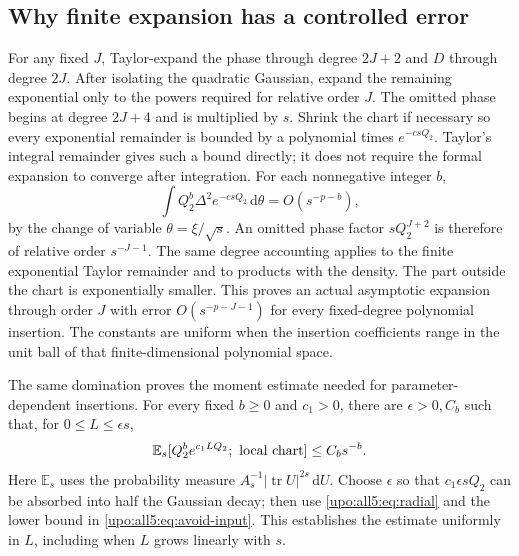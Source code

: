 \documentclass[11pt,letterpaper]{article}
\theoremstyle{remark}\newtheorem{remark}[theorem]{Remark}
\numberwithin{equation}{section}
\newcommand{\E}{\mathbb E}
\newcommand{\tr}{\operatorname{tr}}
\newcommand{\dd}{\,\mathrm d}
\begin{document}
\subsection{Why finite expansion has a controlled error}
For any fixed $J$, Taylor-expand the phase through degree $2J+2$
and $D$ through degree $2J$. After isolating the quadratic Gaussian,
expand the remaining exponential only to the powers required for
relative order $J$. The omitted phase begins at degree $2J+4$ and
is multiplied by $s$. Shrink the chart if necessary so every
exponential remainder is bounded by a polynomial times
$e^{-csQ_2}$. Taylor's integral remainder gives such a bound directly;
it does not require the formal expansion to converge after integration.
For each nonnegative integer $b$,
\begin{equation}\label{upo:all5:eq:radial}
 \int Q_2^b\Delta^2e^{-csQ_2}\dd\theta
                   =O(s^{-p-b}),
\end{equation}
by the change of variable $\theta=\xi/\sqrt{s}$.
An omitted phase factor $sQ_2^{J+2}$ is therefore of relative
order $s^{-J-1}$. The same degree accounting applies to the finite
exponential Taylor remainder and to products with the density.
The part outside the chart is exponentially smaller. This proves
an actual asymptotic expansion through order $J$ with error
$O(s^{-p-J-1})$ for every fixed-degree polynomial insertion.
The constants are uniform when the insertion coefficients range in
the unit ball of that finite-dimensional polynomial space.

The same domination proves the moment estimate needed for
parameter-dependent insertions. For every fixed $b\ge0$ and $c_1>0$,
there are $\epsilon>0,C_b$ such that, for $0\le L\le\epsilon s$,
\begin{equation}\label{upo:all5:eq:tilted-moment}
 \E_s[Q_2^b e^{c_1LQ_2};\ \hbox{local chart}]
                        \le C_b s^{-b}.
\end{equation}
Here $\E_s$ uses the probability measure
$A_s^{-1}|\tr U|^{2s}\dd U$. Choose $\epsilon$ so that
$c_1\epsilon sQ_2$ can be absorbed into half the Gaussian decay;
then use \eqref{upo:all5:eq:radial} and the lower bound in
\eqref{upo:all5:eq:avoid-input}. This establishes the estimate uniformly in
$L$, including when $L$ grows linearly with $s$.
\end{document}
